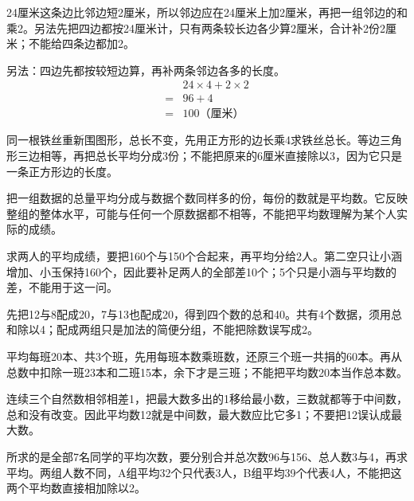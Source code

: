 \documentclass[multi=snippet,border=0pt]{standalone}
\newenvironment{snippet}[3]{\begin{minipage}{#1bp}\color{answerred}\fontsize{#2}{#3}\selectfont\raggedright}{\end{minipage}}
\begin{document}
\begin{snippet}{505}{11.5}{14}24厘米这条边比邻边短2厘米，所以邻边应在24厘米上加2厘米，再把一组邻边的和乘2。另法先把四边都按24厘米计，只有两条较长边各少算2厘米，合计补2份2厘米；不能给四条边都加2。\par 另法：四边先都按较短边算，再补两条邻边各多的长度。\[\begin{aligned}&24\times4+2\times2\\={}&96+4\\={}&100\text{（厘米）}\end{aligned}\]\end{snippet}
\begin{snippet}{505}{11.5}{14}同一根铁丝重新围图形，总长不变，先用正方形的边长乘4求铁丝总长。等边三角形三边相等，再把总长平均分成3份；不能把原来的6厘米直接除以3，因为它只是一条正方形边的长度。\end{snippet}
\begin{snippet}{505}{11.5}{14}把一组数据的总量平均分成与数据个数同样多的份，每份的数就是平均数。它反映整组的整体水平，可能与任何一个原数据都不相等，不能把平均数理解为某个人实际的成绩。\end{snippet}
\begin{snippet}{505}{11.5}{14}求两人的平均成绩，要把160个与150个合起来，再平均分给2人。第二空只让小涵增加、小玉保持160个，因此要补足两人的全部差10个；5个只是小涵与平均数的差，不能用于这一问。\end{snippet}
\begin{snippet}{505}{11.5}{14}先把12与8配成20，7与13也配成20，得到四个数的总和40。共有4个数据，须用总和除以4；配成两组只是加法的简便分组，不能把除数误写成2。\end{snippet}
\begin{snippet}{505}{11.5}{14}平均每班20本、共3个班，先用每班本数乘班数，还原三个班一共捐的60本。再从总数中扣除一班23本和二班15本，余下才是三班；不能把平均数20本当作总本数。\end{snippet}
\begin{snippet}{505}{11.5}{14}连续三个自然数相邻相差1，把最大数多出的1移给最小数，三数就都等于中间数，总和没有改变。因此平均数12就是中间数，最大数应比它多1；不要把12误认成最大数。\end{snippet}
\begin{snippet}{505}{11.5}{14}所求的是全部7名同学的平均次数，要分别合并总次数96与156、总人数3与4，再求平均。两组人数不同，A组平均32个只代表3人，B组平均39个代表4人，不能把这两个平均数直接相加除以2。\end{snippet}
\end{document}
